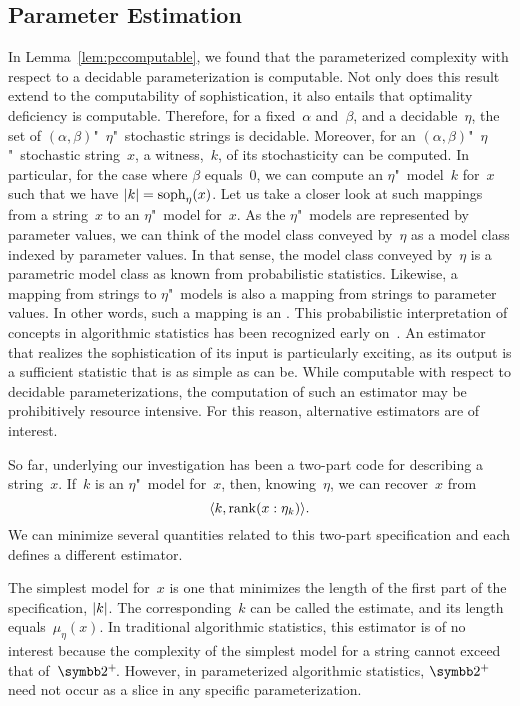 \subsection{Parameter Estimation}
\label{sec:statistics:estimation}%
In Lemma~\ref{lem:pccomputable}, we found that the parameterized complexity with respect to a decidable parameterization is computable.
Not only does this result extend to the computability of sophistication, it also entails that optimality deficiency is computable.
Therefore, for a fixed~$\alpha$ and~$\beta$, and a decidable~$\eta$, the set of $(\alpha, \beta)$"~$\eta$"~stochastic strings is decidable.
Moreover, for an $(\alpha, \beta)$"~$\eta$"~stochastic string~$x$, a witness,~$k$, of its stochasticity can be computed.
In particular, for the case where $\beta$ equals~$0$, we can compute an $\eta$"~model~$k$ for~$x$ such that we have ${\lvert k\rvert} = \operatorname{soph}_\eta(x)$.
Let us take a closer look at such mappings from a string~$x$ to an $\eta$"~model for~$x$.
As the $\eta$"~models are represented by parameter values, we can think of the model class conveyed by~$\eta$ as a model class indexed by parameter values.
In that sense, the model class conveyed by~$\eta$ is a parametric model class as known from probabilistic statistics.
Likewise, a mapping from strings to $\eta$"~models is also a mapping from strings to parameter values.
In other words, such a mapping is an .
This probabilistic interpretation of concepts in algorithmic statistics has been recognized early on~\parencite{rissanen1983universal,vitanyi2000minimum,gacs2001algorithmic}.
An estimator that realizes the sophistication of its input is particularly exciting, as its output is a sufficient statistic that is as simple as can be.
While computable with respect to decidable parameterizations, the computation of such an estimator may be prohibitively resource intensive.
For this reason, alternative estimators are of interest.

So far, underlying our investigation has been a two-part code for describing a string~$x$.
If~$k$ is an $\eta$"~model for~$x$, then, knowing~$\eta$, we can recover~$x$ from
\begin{equation}
\label{eq:two-part}
  {\langle k, \operatorname{rank}(x : \eta_k)\rangle}.
\end{equation}
We can minimize several quantities related to this two-part specification and each defines a different estimator.

The simplest model for~$x$ is one that minimizes the length of the first part of the specification, ${\lvert k\rvert}$.
The corresponding~$k$ can be called the  estimate, and its length equals~$\mu_\eta(x)$.
In traditional algorithmic statistics, this estimator is of no interest because the complexity of the simplest model for a string cannot exceed that of~$\binary^+\!$.
However, in parameterized algorithmic statistics, $\binary^+$ need not occur as a slice in any specific parameterization.

